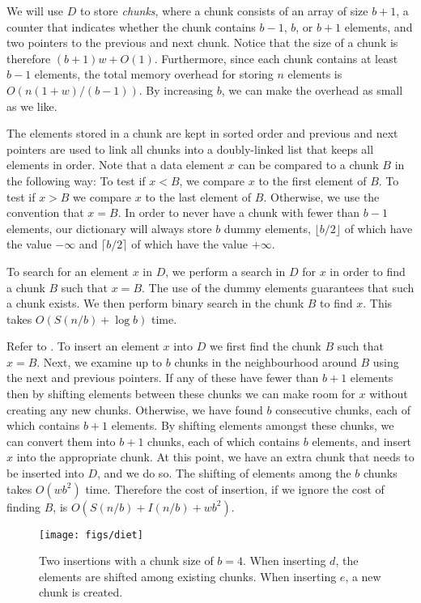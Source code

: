 We will use $D$ to store \emph{chunks}, where a chunk consists of an array
of size $b+1$, a counter that indicates whether the chunk contains $b-1$,
$b$, or $b+1$ elements, and two pointers to the previous and next chunk.
Notice that the size of a chunk is therefore $(b+1)w+O(1)$.  Furthermore,
since each chunk contains at least $b-1$ elements, the total memory overhead
for storing $n$ elements is $O(n(1+w)/(b-1))$.  By increasing $b$, we can
make the overhead as small as we like.

The elements stored in a chunk are kept in sorted order and previous and
next pointers are used to link all chunks into a doubly-linked list that
keeps all elements in order.  Note that a data element $x$ can be compared
to a chunk $B$ in the following way: To test if $x< B$, we compare $x$ to
the first element of $B$.  To test if $x> B$ we compare $x$ to the last
element of $B$.  Otherwise, we use the convention that $x=B$.  In order
to never have a chunk with fewer than $b-1$ elements, our dictionary will
always store $b$ dummy elements, $\lfloor b/2\rfloor$ of which have the
value $-\infty$ and $\lceil b/2\rceil$ of which have the value $+\infty$.

To search for an element $x$ in $D$, we perform a search in $D$ for $x$
in order to find a chunk $B$ such that $x=B$.  The use of the dummy
elements guarantees that such a chunk exists.   We then perform binary
search in the chunk $B$ to find $x$.  This takes $O(S(n/b) + \log b)$ time.

Refer to .  To insert an element $x$ into $D$ we first find
the chunk $B$ such that $x=B$. Next, we examine up to $b$ chunks in the
neighbourhood around $B$ using the next and previous pointers.  If any
of these have fewer than $b+1$ elements then by shifting elements between
these chunks we can make room for $x$ without creating any new chunks.
Otherwise, we have found $b$ consecutive chunks, each of which contains
$b+1$ elements.  By shifting elements amongst these chunks, we can convert
them into $b+1$ chunks, each of which contains $b$ elements, and insert $x$
into the appropriate chunk. At this point, we have an extra chunk that
needs to be inserted into $D$, and we do so.  The shifting of elements among
the $b$ chunks takes $O(wb^2)$ time.  Therefore the cost of insertion, if we
ignore the cost of finding $B$, is $O(S(n/b) + I(n/b) + wb^2)$.

\begin{figure}
  \begin{center}
    \texttt{[image: figs/diet]}
  \end{center}
  \caption{Two insertions with a chunk size of $b=4$.  When inserting $d$,
the elements are shifted among existing chunks.  When inserting $e$, a new chunk is created.}
\end{figure}

